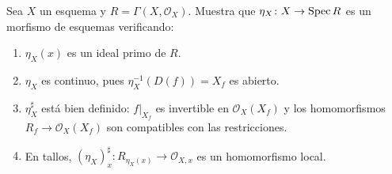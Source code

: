 \begin{ejer}
\label{ejer:s08-verificacion-morfismo-canonico}
Sea $X$ un esquema y $R=\Gamma(X,\mathcal O_X)$. Muestra que $\eta_X\colon X\to\operatorname{Spec} R$ es un morfismo de esquemas verificando:
\begin{enumerate}[label=(\roman*)]
\item $\eta_X(x)$ es un ideal primo de $R$.
\item $\eta_X$ es continuo, pues $\eta_X^{-1}(D(f))=X_f$ es abierto.
\item $\eta_X^\sharp$ está bien definido: $f|_{X_f}$ es invertible en $\mathcal O_X(X_f)$ y los homomorfismos $R_f\to\mathcal O_X(X_f)$ son compatibles con las restricciones.
\item En tallos, $(\eta_X)_x^\sharp\colon R_{\eta_X(x)}\to\mathcal O_{X,x}$ es un homomorfismo local.
\end{enumerate}
\end{ejer}
